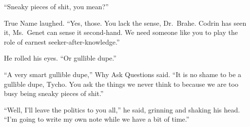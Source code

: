 ``Sneaky pieces of shit, you mean?''

True Name laughed. ``Yes, those. You lack the sense, Dr.~Brahe. Codrin has seen it, Ms.~Genet can sense it second-hand. We need someone like you to play the role of earnest seeker-after-knowledge.''

He rolled his eyes. ``Or gullible dupe.''

``A very smart gullible dupe,'' Why Ask Questions said. ``It is no shame to be a gullible dupe, Tycho. You ask the things we never think to because we are too busy being sneaky pieces of shit.''

``Well, I'll leave the politics to you all,'' he said, grinning and shaking his head. ``I'm going to write my own note while we have a bit of time.''

